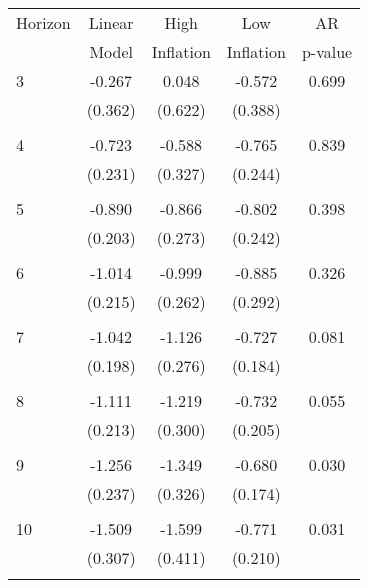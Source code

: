 \begin{tabular}{l*{1}{cccc}}
\hline\hline
 Horizon  & Linear & High                 & Low           & AR            \\
                  & Model         & Inflation & Inflation & p-value       \\
\hline
   3       & -0.267 & 0.048 & -0.572 & 0.699 \\
          & (0.362) & (0.622) & (0.388) & \\
 & & & &\\
   4       & -0.723 & -0.588 & -0.765 & 0.839 \\
          & (0.231) & (0.327) & (0.244) & \\
 & & & &\\
   5       & -0.890 & -0.866 & -0.802 & 0.398 \\
          & (0.203) & (0.273) & (0.242) & \\
 & & & &\\
   6       & -1.014 & -0.999 & -0.885 & 0.326 \\
          & (0.215) & (0.262) & (0.292) & \\
 & & & &\\
   7       & -1.042 & -1.126 & -0.727 & 0.081 \\
          & (0.198) & (0.276) & (0.184) & \\
 & & & &\\
   8       & -1.111 & -1.219 & -0.732 & 0.055 \\
          & (0.213) & (0.300) & (0.205) & \\
 & & & &\\
   9       & -1.256 & -1.349 & -0.680 & 0.030 \\
          & (0.237) & (0.326) & (0.174) & \\
 & & & &\\
  10       & -1.509 & -1.599 & -0.771 & 0.031 \\
          & (0.307) & (0.411) & (0.210) & \\
 & & & &\\
\hline\hline
\end{tabular}
